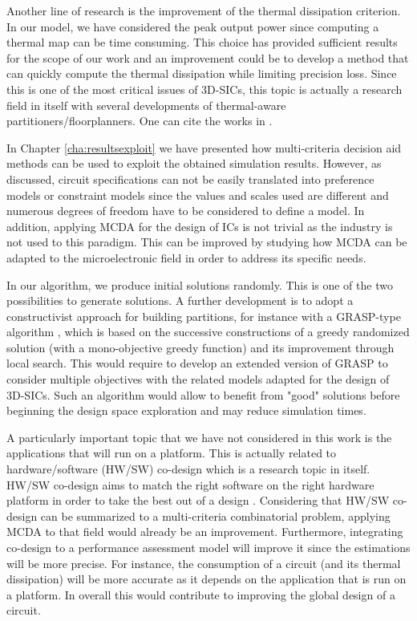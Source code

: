 Another line of research is the improvement of the thermal dissipation criterion. In our model, we have considered the peak output power since computing a thermal map can be time consuming. This choice has provided sufficient results for the scope of our work and an improvement could be to develop a method that can quickly compute the thermal dissipation while limiting precision loss. Since this is one of the most critical issues of 3D-SICs, this topic is actually a research field in itself with several developments of thermal-aware partitioners/floorplanners. One can cite the works in \cite{1594713,1112292,1486402}.

In Chapter \ref{cha:resultsexploit} we have presented how multi-criteria decision aid methods can be used to exploit the obtained simulation results. However, as discussed, circuit specifications can not be easily translated into preference models or constraint models since the values and scales used are different and numerous degrees of freedom have to be considered to define a model. In addition, applying MCDA for the design of ICs is not trivial as the industry is not used to this paradigm. This can be improved by studying how MCDA can be adapted to the microelectronic field in order to address its specific needs. %

In our algorithm, we produce initial solutions randomly. This is one of the two possibilities to generate solutions. A further development is to adopt a constructivist approach for building partitions, for instance with a GRASP-type algorithm \cite{HarSho87a,DBLP:dblp_conf/sccc/ViannaAVA05}, which is based on the successive constructions of a greedy randomized solution (with a mono-objective greedy function) and its improvement through local search. This would require to develop an extended version of GRASP to consider multiple objectives with the related models adapted for the design of 3D-SICs. Such an algorithm would allow to benefit from "good" solutions before beginning the design space exploration and may reduce simulation times.

A particularly important topic that we have not considered in this work is the applications that will run on a platform. This is actually related to hardware/software (HW/SW) co-design which is a research topic in itself. HW/SW co-design aims to match the right software on the right hardware platform in order to take the best out of a design \cite{abdallah2011}. Considering that HW/SW co-design can be summarized to a multi-criteria combinatorial problem, applying MCDA to that field would already be an improvement. Furthermore, integrating co-design to a performance assessment model will improve it since the estimations will be more precise. For instance, the consumption of a circuit (and its thermal dissipation) will be more accurate as it depends on the application that is run on a platform. In overall this would contribute to improving the global design of a circuit.

